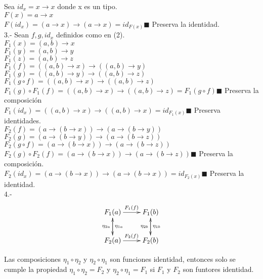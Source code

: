 \documentclass{article}
\begin{document}
Sea $id_{x} = x \rightarrow x$ donde x es un tipo.\\
$F(x)=a \rightarrow x$\\
$F(id_{x})= (a \rightarrow x) \rightarrow (a \rightarrow x) = id_{F(x)} \blacksquare$ Preserva la identidad. \\

3.- Sean $f,g,id_{x}$ definidos como en (2).\\
$F_{1} (x)=(a,b) \rightarrow x$\\
$F_{1} (y)=(a,b) \rightarrow y$\\
$F_{1} (z)=(a,b) \rightarrow z$\\
$F_{1} (f)=((a,b) \rightarrow x) \rightarrow ((a,b) \rightarrow y)$\\
$F_{1} (g)=((a,b) \rightarrow y) \rightarrow ((a,b) \rightarrow z)$\\
$F_{1} (g \circ f)=((a,b) \rightarrow x) \rightarrow ((a,b) \rightarrow z)$\\
$F_{1}(g) \circ F_{1}(f)=((a,b) \rightarrow x) \rightarrow ((a,b) \rightarrow z)=F_{1} (g \circ f) \blacksquare$ Preserva la composición\\
$F_{1} (id_{x}) = ((a,b) \rightarrow x) \rightarrow ((a,b) \rightarrow x)=id_{F_{1}(x)} \blacksquare$ Preserva identidades.\\

$F_{2} (f) = (a \rightarrow (b \rightarrow x)) \rightarrow (a \rightarrow (b \rightarrow y))$\\
$F_{2} (g) = (a \rightarrow (b \rightarrow y)) \rightarrow (a \rightarrow (b \rightarrow z))$\\
$F_{2} (g \circ f) = (a \rightarrow (b \rightarrow x)) \rightarrow (a \rightarrow (b \rightarrow z))$\\
$F_{2} (g) \circ F_{2} (f) = (a \rightarrow (b \rightarrow x)) \rightarrow (a \rightarrow (b \rightarrow z)) \blacksquare$ Preserva la composición.\\
$F_{2} (id_{x}) = (a \rightarrow (b \rightarrow x)) \rightarrow (a \rightarrow (b \rightarrow x)) = id_{F_{2}(x)} \blacksquare$ Preserva la identidad.\\

4.- \\

\[
\xymatrix{
F_{1}(a) \ar[d]^{\eta_{1a}} \ar[r]^{F_{1}(f)} & F_{1}(b) \ar[d]^{\eta_{1b}} \\
F_{2}(a) \ar[r]^{F_{2}(f)} \ar[u]^{\eta_{2a}} & F_{2}(b) \ar[u]^{\eta_{2b}}
}
\]

Las composiciones $\eta_{1} \circ \eta_{2}$ y $\eta_{2} \circ \eta_{1}$ son funciones identidad, entonces solo se cumple la propiedad $\eta_{1} \circ \eta_{2} = F_{2}$ y $\eta_{2} \circ \eta_{1} = F_{1}$ si $F_{1}$ y $F_{2}$ son funtores identidad.\\
\end{document}
